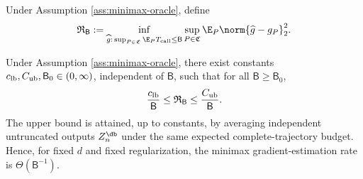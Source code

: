 Under Assumption \ref{ass:minimax-oracle}, define
\begin{equation}\label{eq:minimax-risk}
 \mathfrak R_{\mathsf B}
 :=\inf_{\widehat g:\,\sup_{P\in\mathfrak C}\E_P T_{\rm call}\le\mathsf B}
 \sup_{P\in\mathfrak C}
 \E_P\norm{\widehat g-g_P}_2^2.
\end{equation}

\begin{theorem}\label{thm:minimax}
Under Assumption \ref{ass:minimax-oracle}, there exist constants
$c_{\rm lb},C_{\rm ub},\mathsf B_0\in(0,\infty)$, independent of $\mathsf B$, such that for all $\mathsf B\ge\mathsf B_0$,
\begin{equation}\label{eq:minimax-rate}
 \frac{c_{\rm lb}}{\mathsf B}
 \le \mathfrak R_{\mathsf B}
 \le \frac{C_{\rm ub}}{\mathsf B}.
\end{equation}
The upper bound is attained, up to constants, by averaging independent untruncated outputs $Z_n^{\db}$ under the same expected complete-trajectory budget.  Hence, for fixed $d$ and fixed regularization, the minimax gradient-estimation rate is $\Theta(\mathsf B^{-1})$.
\end{theorem}

